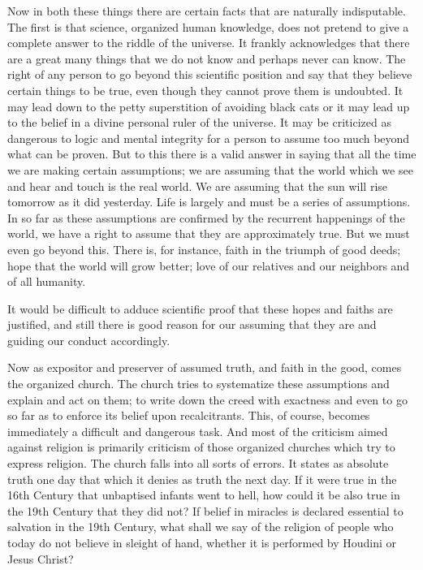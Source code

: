 \documentclass[letterpaper,10pt,english]{jupyterBook}
\begin{document}
\sphinxAtStartPar
Now in both these things there are certain facts that are naturally indisputable. The first is that science, organized human knowledge, does not pretend to give a complete answer to the riddle of the universe. It frankly acknowledges that there are a great many things that we do not know and perhaps never can know. The right of any person to go beyond this scientific position and say that they believe certain things to be true, even though they cannot prove them is undoubted. It may lead down to the petty superstition of avoiding black cats or it may lead up to the belief in a divine personal ruler of the universe. It may be criticized as dangerous to logic and mental integrity for a person to assume too much beyond what can be proven. But to this there is a valid answer in saying that all the time we are making certain assumptions; we are assuming that the world which we see and hear and touch is the real world. We are assuming that the sun will rise tomorrow as it did yesterday. Life is largely and must be a series of assumptions. In so far as these assumptions are confirmed by the recurrent happenings of the world, we have a right to assume that they are approximately true. But we must even go beyond this. There is, for instance, faith in the triumph of good deeds; hope that the world will grow better; love of our relatives and our neighbors and of all humanity.

\sphinxAtStartPar
It would be difficult to adduce scientific proof that these hopes and faiths are justified, and still there is good reason for our assuming that they are and guiding our conduct accordingly.

\sphinxAtStartPar
Now as expositor and preserver of assumed truth, and faith in the good, comes the organized church. The church tries to systematize these assumptions and explain and act on them; to write down the creed with exactness and even to go so far as to enforce its belief upon recalcitrants. This, of course, becomes immediately a difficult and dangerous task. And most of the criticism aimed against religion is primarily criticism of those organized churches which try to express religion. The church falls into all sorts of errors. It states as absolute truth one day that which it denies as truth the next day. If it were true in the 16th Century that unbaptised infants went to hell, how could it be also true in the 19th Century that they did not? If belief in miracles is declared essential to salvation in the 19th Century, what shall we say of the religion of people who today do not believe in sleight of hand, whether it is performed by Houdini or Jesus Christ?
\end{document}
